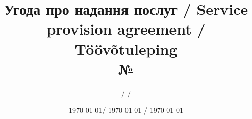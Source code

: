 %
%
%
%
%



  \begin{Form}
    \title{Угода про надання послуг / Service provision agreement / Töövõtuleping\\№ }
    \author{ /  / }
    \date{\today / \textenglish{\today} / \textestonian{\today}}
    \maketitle
    \thispagestyle{fancy}


\end{Form}
